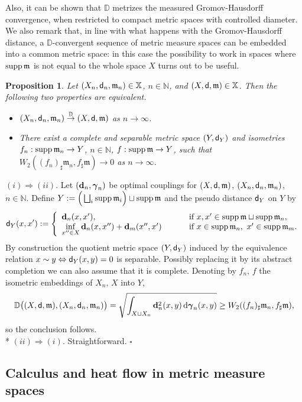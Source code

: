 \documentclass[reqno,11pt]{article}
\numberwithin{equation}{section}
\newcommand{\D}{\mathbb{D}}
\newcommand{\N}{\mathbb{N}}
\newcommand{\mm}{{\mbox{\boldmath$m$}}}
\newcommand{\ggamma}{{\mbox{\boldmath$\gamma$}}}
\newcommand{\sfd}{{\sf d}}
\newcommand{\supp}{\mathop{\rm supp}\nolimits}   %
\renewcommand{\d}{{\mathrm d}}
\newenvironment{proof}{\removelastskip\par\medskip   %
\noindent{\em Proof.}
\rm}{\penalty-20\null\hfill$\square$\par\medbreak}
\newtheorem{proposition}[theorem]{Proposition}
\newcommand{\X}{\mathbb X}
\renewcommand{\mm}{\mathfrak m}
\begin{document}
Also, it can be shown \cite[Lemma~3.7]{Sturm06I} that $\D$ metrizes
the measured Gromov-Hausdorff convergence, when restricted to
compact metric spaces with controlled diameter. We also remark that,
in line with what happens with the Gromov-Hausdorff distance, a
$\D$-convergent sequence of metric measure spaces can be embedded
into a common metric space: in this case the possibility to work in
spaces where $\supp\mm$ is not equal to the whole space $X$ turns
out to be useful.
\begin{proposition}
Let $(X_n,\sfd_n,\mm_n)\in\X$, $n\in\N$, and $(X,\sfd,\mm)\in\X$.
Then the following two properties are equivalent.
\begin{itemize}
\item[(i)] $(X_n,\sfd_n,\mm_n)\stackrel{\D}\to(X,\sfd,\mm)$ as $n\to\infty$.
\item[(ii)] There exist a complete and separable metric
space $(Y,\sfd_Y)$ and isometries $f_n:\supp\mm_n\to Y$, $n\in\N$,
$f:\supp\mm\to Y$, such that $W_2((f_n)_\sharp\mm_n,f_\sharp\mm)\to
0$ as $n\to\infty$.
\end{itemize}
\end{proposition}
\begin{proof} $(i)\Rightarrow (ii)$. Let $({\bf d}_n,\ggamma_n)$ be optimal
couplings for $(X,\sfd,\mm)$, $(X_n,\sfd_n,\mm_n)$, $n\in\N$. Define
$Y:=\Big(\bigsqcup_i\supp\mm_i\Big)\sqcup \supp\mm$ and the
pseudo distance $\sfd_Y$ on $Y$ by
\[
\sfd_Y(x,x'):=\left\{\begin{array}{ll}
{\bf d}_n(x,x') ,&\qquad\textrm{ if }x,x'\in \supp\mm\sqcup \supp\mm_n,\\
\inf\limits_{x''\in X} {\bf d}_n(x,x'')+{\bf d}_m(x'',x')&
\qquad\textrm{ if }x\in \supp\mm_n,\ x'\in \supp\mm_m.
\end{array}
\right.
\]
By construction the quotient metric space $(Y,\sfd_Y)$ induced by
the equivalence relation $x\sim y\Leftrightarrow \sfd_Y(x,y)=0$ is
separable. Possibly replacing it by its abstract completion we can
also assume that it is complete. Denoting by $f_n,\,f$ the isometric
embeddings of $X_n,\,X$ into $Y$,
\[
\D\big((X,\sfd,\mm),(X_n,\sfd_n,\mm_n)\big)= \sqrt{\int_{X\sqcup
X_n}{\bf d}_n^2(x,y)\,\d\ggamma_n(x,y)}\geq
W_2((f_n)_\sharp\mm_n,f_\sharp\mm),
\]
so the conclusion follows.\\* $(ii)\Rightarrow (i)$.
Straightforward.
\end{proof}

\subsection{Calculus and heat flow in metric measure
spaces}\label{sub4}
\end{document}
